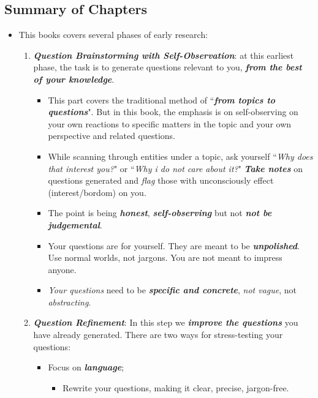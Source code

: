\documentclass[11pt]{article}
\begin{document}
\subsection{Summary of Chapters}
\begin{itemize}
\item This books covers several phases of early research:
\begin{enumerate}
\item \emph{\textbf{Question Brainstorming with Self-Observation}}: at this earliest phase, the task is to generate questions relevant to you, \emph{\textbf{from the best of your knowledge}}. 

\begin{itemize}
\item This part covers the traditional method of ``\emph{\textbf{from topics to questions}}". But in this book, the emphasis is on self-observing on your own reactions to specific matters in the topic and your own perspective and related questions. 

\item While scanning through entities under a topic, ask yourself  ``\emph{Why does that interest you?}" or ``\emph{Why i do not care about it?}" \emph{\textbf{Take notes}} on questions generated and \emph{flag} those with unconsciously effect (interest/bordom) on you. 

\item The point is being \emph{\textbf{honest}}, \emph{\textbf{self-observing}} but not \emph{\textbf{not be judgemental}}. 


\item Your questions are for yourself. They are meant to be \emph{\textbf{unpolished}}. Use normal worlds, not jargons. You are not meant to impress anyone. 

\item \emph{Your questions} need to be \emph{\textbf{specific and concrete}}, \emph{not vague}, not \emph{abstracting}. 
\end{itemize}

\item  \emph{\textbf{Question Refinement}}: In this step we \emph{\textbf{improve the questions}} you have already generated. 
There are two ways for stress-testing your questions:
\begin{itemize}
\item Focus on \emph{\textbf{language}};
\begin{itemize}
\item Rewrite your questions, making it clear, precise, jargon-free.


\end{itemize}
\end{itemize}
\end{enumerate}
\end{itemize}
\end{document}
